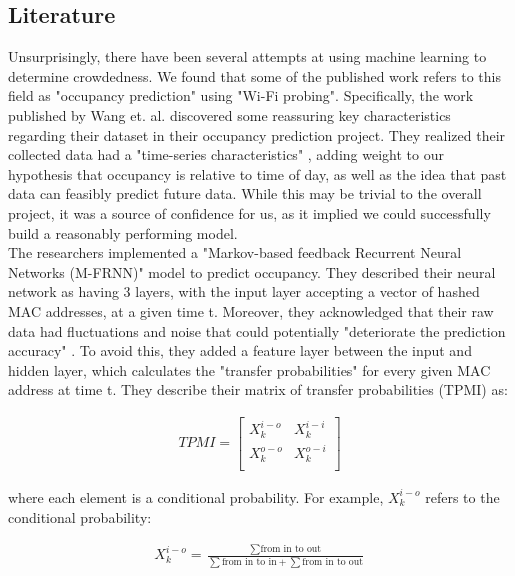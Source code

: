 \documentclass[journal, 12pt]{IEEEtran}
\begin{document}
\subsection{Literature}
\noindent Unsurprisingly, there have been several attempts at using machine learning to determine crowdedness. We found that some of the published work refers to this field as "occupancy prediction" using "Wi-Fi probing"\cite{wang2018occupancy}. Specifically, the work published by Wang et. al. discovered some reassuring key characteristics regarding their dataset in their occupancy prediction project. They realized their collected data had a "time-series characteristics" \cite{wang2018occupancy}, adding weight to our hypothesis that occupancy is relative to time of day, as well as the idea that past data can feasibly predict future data. While this may be trivial to the overall project, it was a source of confidence for us, as it implied we could successfully build a reasonably performing model. \\

\noindent The researchers implemented a "Markov-based feedback Recurrent Neural Networks (M-FRNN)" \cite{wang2018occupancy} model to predict occupancy. They described their neural network as having 3 layers, with the input layer accepting a vector of hashed MAC addresses, at a given time t. Moreover, they acknowledged that their raw data had fluctuations and noise that could potentially "deteriorate the prediction accuracy" \cite{wang2018occupancy}. To avoid this, they added a feature layer between the input and hidden layer, which calculates the "transfer probabilities" for every given MAC address at time t\cite{wang2018occupancy}. They describe their matrix of transfer probabilities (TPMI) as: 

\begin{gather}
 TPMI
 =
  \begin{bmatrix}
   X_{k}^{i-o} & X_{k}^{i-i}\\
   X_{k}^{o-o} & X_{k}^{o-i}\\
   \end{bmatrix}
\end{gather}

\noindent where each element is a conditional probability. For example, $X_{k}^{i-o}$ refers to the conditional probability:

\begin{equation}
    \begin{split}
        X_{k}^{i-o} = \frac{\sum{\text{from in to out}}}{\sum{\text{from in to in}} + \sum{\text{from in to out}}}
    \end{split}
    \label{eq:}
\end{equation}
\end{document}

